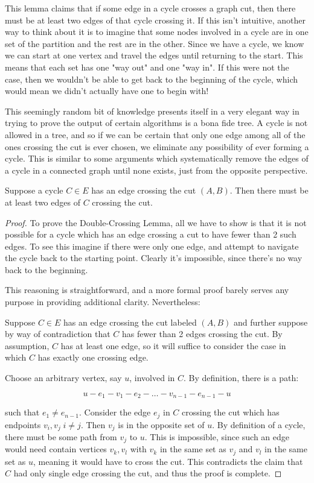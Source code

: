 \documentclass{standalone}
\begin{document}
This lemma claims that if some edge in a cycle crosses a graph cut, then there
must be at least two edges of that cycle crossing it. If this isn't intuitive,
another way to think about it is to imagine that some nodes involved in a cycle
are in one set of the partition and the rest are in the other. Since we have a
cycle, we know we can start at one vertex and travel the edges until returning
to the start. This means that each set has one "way out" and one "way in". If
this were not the case, then we wouldn't be able to get back to the beginning
of the cycle, which would mean we didn't actually have one to begin with!

This seemingly random bit of knowledge presents itself in a very elegant way in
trying to prove the output of certain algorithms is a bona fide tree. A cycle
is not allowed in a tree, and so if we can be certain that only one edge among
all of the ones crossing the cut is ever chosen, we eliminate any possibility
of ever forming a cycle. This is similar to some arguments which systematically
remove the edges of a cycle in a connected graph until none exists, just from
the opposite perspective.

\begin{lemma} \label{lem:doublecross}
  Suppose a cycle $C \in E$ has an edge crossing the cut $(A, B)$. Then there
  must be at least two edges of $C$ crossing the cut.
\end{lemma}

\begin{proof}
  To prove the Double-Crossing Lemma, all we have to show is that it is not
  possible for a cycle which has an edge crossing a cut to have fewer than 2
  such edges. To see this imagine if there were only one edge, and attempt to
  navigate the cycle back to the starting point. Clearly it's impossible, since
  there's no way back to the beginning.

  This reasoning is straightforward, and a more formal proof barely serves any
  purpose in providing additional clarity. Nevertheless:

  Suppose $C \in E$ has an edge crossing the cut labeled $(A, B)$ and further
  suppose by way of contradiction that $C$ has fewer than 2 edges crossing the
  cut. By assumption, $C$ has at least one edge, so it will suffice to consider
  the case in which $C$ has exactly one crossing edge.

  Choose an arbitrary vertex, say $u$, involved in $C$. By definition, there is
  a path:

  \[
    u-e_1-v_1-e_2-\dots-v_{n-1}-e_{n-1}-u
  \]

  such that $e_1 \neq e_{n-1}$. Consider the edge $e_j$ in $C$ crossing the cut
  which has endpoints $v_i, v_j \; i \neq j$. Then $v_j$ is in the opposite set
  of $u$. By definition of a cycle, there must be some path from $v_j$ to $u$.
  This is impossible, since such an edge would need contain vertices $v_k, v_l$
  with $v_k$ in the same set as $v_j$ and $v_l$ in the same set as $u$, meaning
  it would have to cross the cut. This contradicts the claim that $C$ had only
  single edge crossing the cut, and thus the proof is complete.
\end{proof}
\end{document}
